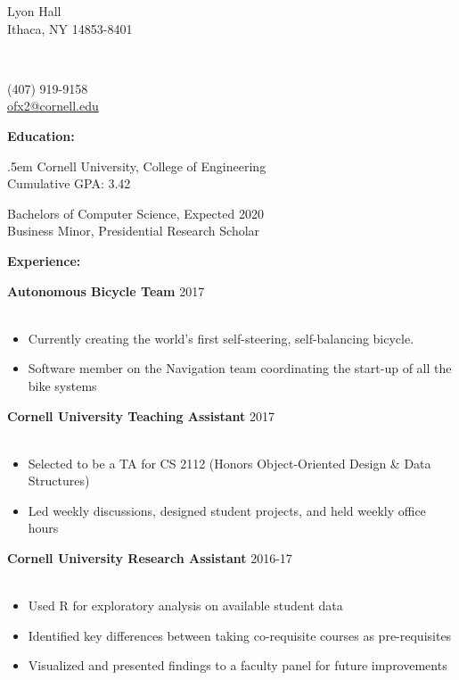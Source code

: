 \documentclass[12pt]{article}
\makeatletter
\newcommand{\name}{OLIVIA XIANG}
\newcommand{\addressPartOne}{402 Lyon Hall}
\newcommand{\addressPartTwo}{Ithaca, NY 14853-8401}
\newcommand{\phoneNumber}{(407) 919-9158}
\newcommand{\email}{ofx2@cornell.edu}
\newcommand{\gpa}{3.42}
\newcommand{\header}[5]{
	\begin{minipage}{0.3\linewidth} 
		\fontsize{12}{0} \selectfont
		#2\\[.25em]
		#3\\
		\vspace{1em} 
	\end{minipage}
	\vspace{-.75em}
	\begin{minipage}{0.4\linewidth} 
		\fontsize{16}{0} \selectfont
		\center{\textbf{#1}}\\
		\vspace{2em} 
	\end{minipage}
	\begin{minipage}{0.25\linewidth}
		\begin{flushright}
			\fontsize{12}{0} \selectfont
			#4\\[.25em]
			#5\\
			\vspace{1em} 
		\end{flushright}
	\end{minipage}
	\makebox[\linewidth]{\rule{100em}{.4pt}}
	\vspace{-.4em}
}
\newcommand{\textBody}[3]{
	\makeCaption{#1}{#2}

	\begin{minipage}{0.97\linewidth} 
		\begin{adjustwidth}{.5em}{}
			\fontsize{11}{13} \selectfont 
			#3
		\end{adjustwidth}
	\end{minipage}
	\vspace{.75em}
}
\newcommand{\captionSplitLeft}[7]{
	\makeCaption{#1}{#2}
	
	\splitLeft{#3}{#4}{#5}{#6}{#7}
}
\newcommand{\splitLeft}[5]{
	\begin{minipage}{#3\linewidth}
		\begin{adjustwidth}{#1}{}
			\fontsize{11}{12} \selectfont
			#2
		\end{adjustwidth}
	\end{minipage}
	\begin{minipage}{#5\linewidth}
		\begin{flushleft}
			\fontsize{11}{12} \selectfont 
			#4
		\end{flushleft}
	\end{minipage} 
	\vspace{1em}
}
\newcommand{\makeCaption}[2]{
	\fontsize{14}{0} \selectfont
	\textbf{#1:}
	\vspace{#2}
}
\newcommand{\group}[1]{
	\fontsize{14}{0} \selectfont
	\textbf{#1}
}
\newcommand{\jobCaption}[2]{
	\hspace{0.3em}
	\fontsize{12}{13} \selectfont
	\textbf{#1}
	\fontsize{11}{12} \selectfont 
	\hfill{#2}\\[.1em]
}
\makeatother
\begin{document}
	\header	{\name}
		{\addressPartOne}
		{\addressPartTwo}
		{\phoneNumber}
		{\href{mailto:\email}{\email}}


\begin{comment}
	\textBody	{Objective}
				{.25em}
				{Looking for opportunities that allow me to enhance my engineering skills with a focus on designing and implementing cutting-edge technical solutions to real-world problems.}
\end{comment}


	\captionSplitLeft{Education}{.4em}{.5em}
		{Cornell University, College of Engineering\\
			Cumulative GPA: \gpa}{.5}
		{Bachelors of Computer Science, Expected 2020\\
			Business Minor, Presidential Research Scholar}{.5}
	\vspace{-.4em}

	\group{Experience:}
	\vspace{.4em}
	
	\jobCaption{Autonomous Bicycle Team}{2017}\\[-1.75em]
	\begin{itemize}[leftmargin=1.5cm]
	\setlength\itemsep{-.25em}
	\fontsize{11}{0} \selectfont
	
	\item Currently creating the world's first self-steering, self-balancing bicycle. 
	\item Software member on the Navigation team coordinating the start-up of all the bike systems
	\end{itemize}
	\vspace{.7em}
	
	\jobCaption{Cornell University Teaching Assistant}{2017}\\[-1.75em]
	\begin{itemize}[leftmargin=1.5cm]
		\setlength\itemsep{-.25em}
		\fontsize{11}{0} \selectfont 
	
		\item Selected to be a TA for CS 2112 (Honors Object-Oriented Design \& Data Structures)
		\item Led weekly discussions, designed student projects, and held weekly office hours
	\end{itemize}
	\vspace{.7em}

	
	\jobCaption{Cornell University Research Assistant}{2016-17}\\[-1.75em]
	\begin{itemize}[leftmargin=1.5cm]
		\setlength\itemsep{-.25em}
		\fontsize{11}{0} \selectfont 
	\item Used R for exploratory analysis on available student data
	\item Identified key differences between taking co-requisite courses as pre-requisites

\item Visualized and presented findings to a faculty panel for future improvements
	
	\end{itemize}
	
\end{document}
